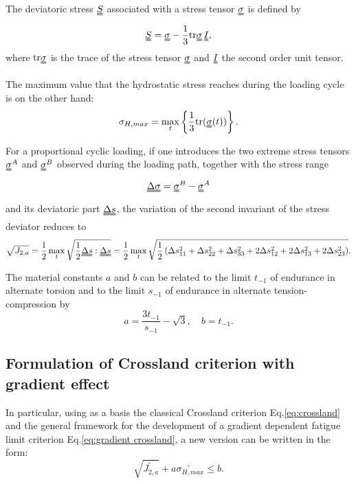 The deviatoric stress $\uuline{S}$ associated with a stress tensor $\uuline{\sigma}$  is defined by
\begin{equation} \uuline{S}=\uuline{\sigma}-\dfrac{1}{3}\textrm{tr}\uuline{\sigma}\, \uuline{I},
\end{equation}
where $\textrm{tr}\uuline{\sigma}$ is the trace of the stress tensor $\uuline{\sigma}$ and $\uuline{I}$ the second order unit tensor.

The maximum value that the hydrostatic stress reaches during the loading cycle is on the other hand:
\begin{equation}
	\sigma_{H,max}=\max\limits_{t}\left\lbrace \dfrac{1}{3}\textrm{tr}(\uuline{\sigma}(t))\right\rbrace .
\end{equation}

For a proportional cyclic loading, if one introduces the two extreme stress tensors $\uuline{\sigma}^A$ and $\uuline{\sigma}^B$ observed during the loading path, together with the stress range 
\begin{equation}\uuline{\Delta\sigma}=\uuline{\sigma}^B-\uuline{\sigma}^A\end{equation}
and its deviatoric part $\uuline{\Delta s} $, the variation of
the second invariant of the stress deviator reduces to 
\begin{equation}\sqrt{J_{2,a}}=\dfrac{1}{2}\max\limits_{t}\sqrt{\dfrac{1}{2}\uuline{\Delta s}:\uuline{\Delta s}}=\dfrac{1}{2}\max\limits_{t}\sqrt{\dfrac{1}{2}\left( \Delta s_{11}^2+\Delta s_{22}^2+\Delta s_{33}^2+2\Delta s_{12}^2+2\Delta s_{13}^2+2\Delta s_{23}^2\right) }.\end{equation}



The material constants $a$ and $b$ can be related to  the limit $t_{-1}$ of endurance in alternate torsion and to the limit $s_{-1}$ of endurance in alternate tension-compression by
\begin{equation}
	a=\dfrac{3 t_{-1}}{s_{-1}}-\sqrt{3},\quad 
	b=t_{-1}.
	\label{crossland-ab}
\end{equation}

\subsection{Formulation of Crossland criterion with gradient effect}

In particular, using as a basis the classical Crossland criterion Eq.\eqref{eq:crossland} and the general framework for the development of a gradient dependent fatigue limit criterion Eq.\eqref{eq:gradient crossland}, a new version can be written in the form:
\begin{equation}
	\sqrt{\widetilde{J_{2,a}}}+a\widetilde{\sigma_{H,max}}\leqslant b .
\end{equation}


